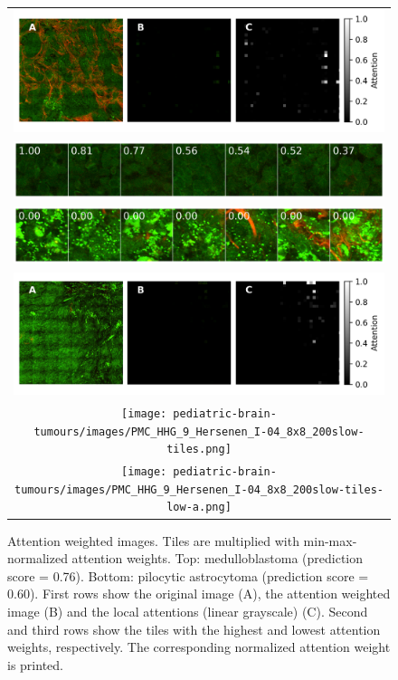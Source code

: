 \begin{figure}
    \centering
    \begin{tabularx}{\linewidth}{c}
        \includegraphics[width=\linewidth]{pediatric-brain-tumours/images/PMC_HHG_36_Hersenen_I-05_8x8_200slow-summary.png} \\
        \includegraphics[width=\linewidth]{pediatric-brain-tumours/images/PMC_HHG_36_Hersenen_I-05_8x8_200slow-tiles.png} \\
        \includegraphics[width=\linewidth]{pediatric-brain-tumours/images/PMC_HHG_36_Hersenen_I-05_8x8_200slow-tiles-low-a.png} \\
        \midrule
        \includegraphics[width=\linewidth]{pediatric-brain-tumours/images/PMC_HHG_9_Hersenen_I-04_8x8_200slow-summary.png} \\
        \texttt{[image: pediatric-brain-tumours/images/PMC\_HHG\_9\_Hersenen\_I-04\_8x8\_200slow-tiles.png]} \\
        \texttt{[image: pediatric-brain-tumours/images/PMC\_HHG\_9\_Hersenen\_I-04\_8x8\_200slow-tiles-low-a.png]}
    \end{tabularx}
    \caption[Attention weighted images]{
        Attention weighted images.
        Tiles are multiplied with min-max-normalized attention weights.
        Top: medulloblastoma (prediction score = 0.76).
        Bottom: pilocytic astrocytoma (prediction score = 0.60).
        First rows show the original image (A), the attention weighted image (B) and the local attentions (linear grayscale) (C).
        Second and third rows show the tiles with the highest and lowest attention weights, respectively.
        The corresponding normalized attention weight is printed.
    }
    \label{fig:a-weighted-images}
\end{figure}

